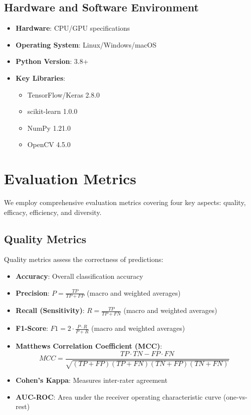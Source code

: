 \documentclass[runningheads]{llncs}
\begin{document}
\subsection{Hardware and Software Environment}

\begin{itemize}
    \item \textbf{Hardware}: CPU/GPU specifications
    \item \textbf{Operating System}: Linux/Windows/macOS
    \item \textbf{Python Version}: 3.8+
    \item \textbf{Key Libraries}:
    \begin{itemize}
        \item TensorFlow/Keras 2.8.0
        \item scikit-learn 1.0.0
        \item NumPy 1.21.0
        \item OpenCV 4.5.0
    \end{itemize}
\end{itemize}

\section{Evaluation Metrics}

We employ comprehensive evaluation metrics covering four key aspects: quality, efficacy, efficiency, and diversity.

\subsection{Quality Metrics}

Quality metrics assess the correctness of predictions:

\begin{itemize}
    \item \textbf{Accuracy}: Overall classification accuracy
    \item \textbf{Precision}: $P = \frac{TP}{TP + FP}$ (macro and weighted averages)
    \item \textbf{Recall (Sensitivity)}: $R = \frac{TP}{TP + FN}$ (macro and weighted averages)
    \item \textbf{F1-Score}: $F1 = 2 \cdot \frac{P \cdot R}{P + R}$ (macro and weighted averages)
    \item \textbf{Matthews Correlation Coefficient (MCC)}: 
    $$MCC = \frac{TP \cdot TN - FP \cdot FN}{\sqrt{(TP+FP)(TP+FN)(TN+FP)(TN+FN)}}$$
    \item \textbf{Cohen's Kappa}: Measures inter-rater agreement
    \item \textbf{AUC-ROC}: Area under the receiver operating characteristic curve (one-vs-rest)
\end{itemize}
\end{document}
